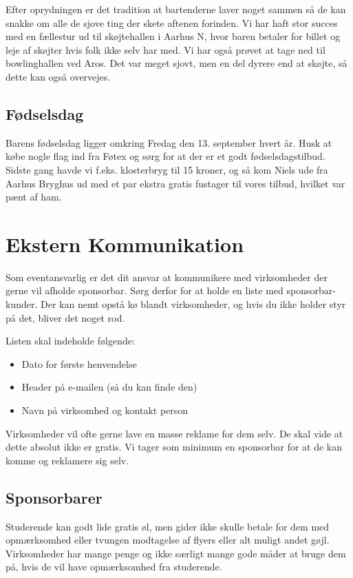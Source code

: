 Efter oprydningen er det tradition at bartenderne laver noget sammen så de kan snakke om alle de sjove ting der skete aftenen forinden. Vi har haft stor succes med en fællestur ud til skøjtehallen i Aarhus N, hvor baren betaler for billet og leje af skøjter hvis folk ikke selv har med. Vi har også prøvet at tage ned til bowlinghallen ved Aros. Det var meget sjovt, men en del dyrere end at skøjte, så dette kan også overvejes.

\subsection*{Fødselsdag}
Barens fødselsdag ligger omkring Fredag den 13. september hvert år. Husk at købe nogle flag ind fra Føtex og sørg for at der er et godt fødselsdagstilbud. Sidste gang havde vi f.eks. klosterbryg til 15 kroner, og så kom Niels ude fra Aarhus Bryghus ud med et par ekstra gratis fustager til vores tilbud, hvilket var pænt af ham.


\section*{Ekstern Kommunikation}
\label{sec:ekst-komm}

Som eventansvarlig er det dit ansvar at kommunikere med virksomheder
der gerne vil afholde sponsorbar. Sørg derfor for at holde en liste
med sponsorbar-kunder. Der kan nemt opstå kø blandt virksomheder, og
hvis du ikke holder styr på det, bliver det noget rod.

Listen skal indeholde følgende:
\begin{itemize}
\item Dato for første henvendelse
\item Header på e-mailen (så du kan finde den)
\item Navn på virksomhed og kontakt person
\end{itemize}

Virksomheder vil ofte gerne lave en masse reklame for dem selv. De skal vide at dette absolut ikke er gratis. Vi tager som minimum en sponsorbar for at de kan komme og reklamere sig selv.

\subsection*{Sponsorbarer}
\label{sec:sponsorbarer}

Studerende kan godt lide gratis øl, men gider ikke skulle betale for
dem med opmærksomhed eller tvungen modtagelse af flyers eller alt
muligt andet gøjl. Virksomheder har mange penge og ikke særligt mange
gode måder at bruge dem på, hvis de vil have opmærksomhed fra
studerende.

